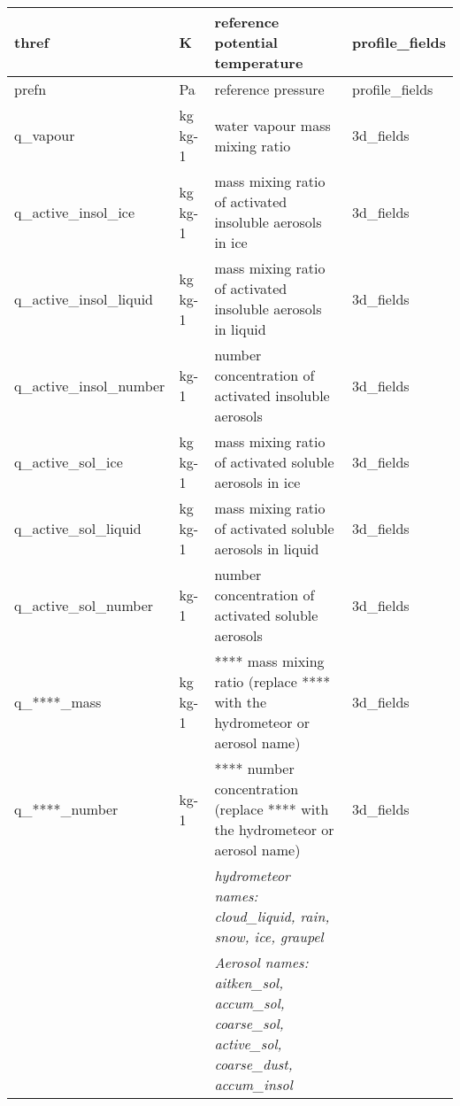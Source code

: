 \begin{table}[h]
\begin{tabular}{|p{4cm}|p{1.2cm}|p{6cm}|p{3.2cm}|}
		thref                  & K              & reference potential temperature                                                                 & profile\_fields       \\ \hline
		prefn                  & Pa             & reference pressure                                                                              & profile\_fields       \\ \hline
		q\_vapour               & kg kg-1        & water vapour mass mixing ratio                                                                  & 3d\_fields                 \\ \hline
		q\_active\_insol\_ice     & kg kg-1        & mass mixing ratio of activated insoluble aerosols in ice                                        & 3d\_fields                 \\ \hline
		q\_active\_insol\_liquid  & kg kg-1        & mass mixing ratio of activated insoluble aerosols in liquid                                     & 3d\_fields                 \\ \hline
		q\_active\_insol\_number  & kg-1           & number concentration of activated insoluble aerosols                                            & 3d\_fields                 \\ \hline
		q\_active\_sol\_ice       & kg kg-1        & mass mixing ratio of activated soluble aerosols in ice                                          & 3d\_fields                 \\ \hline
		q\_active\_sol\_liquid    & kg kg-1        & mass mixing ratio of activated soluble aerosols in liquid                                       & 3d\_fields                 \\ \hline
		q\_active\_sol\_number    & kg-1           & number concentration of activated soluble aerosols                                              & 3d\_fields                 \\ \hline
		q\_****\_mass            & kg kg-1        & **** mass mixing ratio (replace **** with the hydrometeor or aerosol name)                       & 3d\_fields                 \\ \hline
		q\_****\_number          & kg-1           & **** number concentration (replace **** with the hydrometeor or aerosol name)                    & 3d\_fields                 \\ \hline
		&                & \textit{hydrometeor names: cloud\_liquid, rain, snow, ice, graupel}                               &                           \\ \hline
		&                & \textit{Aerosol names: aitken\_sol, accum\_sol, coarse\_sol, active\_sol, coarse\_dust, accum\_insol} &                           \\ \hline
	\end{tabular}%
\end{table}

